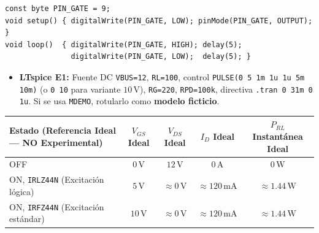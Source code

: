 \documentclass[10pt, a4paper, landscape]{article}
\begin{document}
\begin{verbatim}
const byte PIN_GATE = 9;
void setup() { digitalWrite(PIN_GATE, LOW); pinMode(PIN_GATE, OUTPUT); }
void loop()  { digitalWrite(PIN_GATE, HIGH); delay(5);
               digitalWrite(PIN_GATE, LOW);  delay(5); }
\end{verbatim}

\begin{itemize}[noitemsep, topsep=2pt]
    \item \textbf{LTspice E1:} Fuente DC \texttt{VBUS=12}, \texttt{RL=100}, control \texttt{PULSE(0 5 1m 1u 1u 5m 10m)} (o \texttt{0 10} para variante $10\,\text{V}$), \texttt{RG=220}, \texttt{RPD=100k}, directiva \texttt{.tran 0 31m 0 1u}. Si se usa \texttt{MDEMO}, rotularlo como \textbf{modelo ficticio}.
\end{itemize}

\par\vspace{0.15cm}\noindent
\renewcommand{\arraystretch}{1.25}
\begin{tabularx}{\linewidth}{|>{\raggedright\arraybackslash}X|c|c|c|c|}
\hline
\rowcolor{ucbgray}
\textbf{Estado (Referencia Ideal — NO Experimental)} & \textbf{$V_{GS}$ Ideal} & \textbf{$V_{DS}$ Ideal} & \textbf{$I_D$ Ideal} & \textbf{$P_{RL}$ Instantánea Ideal} \\ \hline
OFF & $0\,\text{V}$ & $12\,\text{V}$ & $0\,\text{A}$ & $0\,\text{W}$ \\ \hline
ON, \texttt{IRLZ44N} (Excitación lógica) & $5\,\text{V}$ & $\approx 0\,\text{V}$ & $\approx 120\,\text{mA}$ & $\approx 1.44\,\text{W}$ \\ \hline
ON, \texttt{IRFZ44N} (Excitación estándar) & $10\,\text{V}$ & $\approx 0\,\text{V}$ & $\approx 120\,\text{mA}$ & $\approx 1.44\,\text{W}$ \\ \hline
\end{tabularx}
\end{document}
